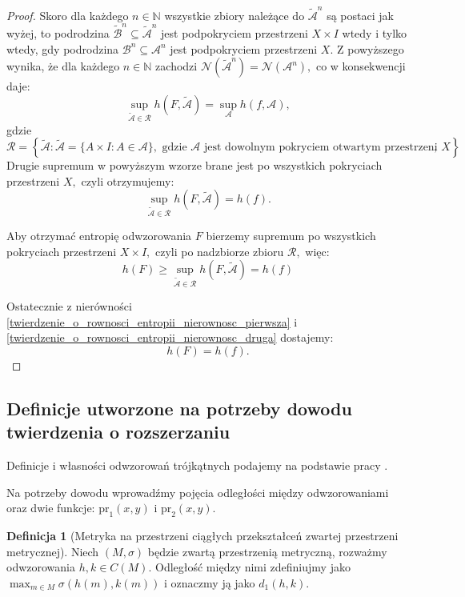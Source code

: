 \documentclass[licencjacka]{pwr_wmat_praca_dyplomowa}
\theoremstyle{plain}
\numberwithin{theorem}{chapter}
\theoremstyle{definition}
\numberwithin{theorem}{chapter}
\newtheorem{definition}[theorem]{Definicja}
\begin{document}
\begin{proof}
Skoro dla każdego $n \in \mathbb{N}$ wszystkie zbiory należące do ${\widetilde{\mathcal{A}}}^n$ są postaci jak wyżej, to podrodzina ${\widetilde{\mathcal{B}}}^n \subseteq {\widetilde{\mathcal{A}}}^n$ jest podpokryciem przestrzeni $X \times I$ wtedy i tylko wtedy, gdy podrodzina $\mathcal{B}^n \subseteq \mathcal{A}^n$ jest podpokryciem przestrzeni $X.$
Z powyższego wynika, że dla każdego $n \in \mathbb{N}$ zachodzi
$\mathcal{N}\left({\widetilde{\mathcal{A}}}^n\right) = \mathcal{N}(\mathcal{A}^n),$
co w konsekwencji daje:
$$\sup_{\widetilde{\mathcal{A}} \in \mathcal{R}} h(F, \widetilde{\mathcal{A}}) = \sup_{\mathcal{A}} h(f, \mathcal{A}),$$
gdzie 
$$\mathcal{R} = \left\{\widetilde{\mathcal{A}} : \widetilde{\mathcal{A}} = \{A \times I : A \in \mathcal{A}\}, \textrm{ gdzie } \mathcal{A} \textrm{ jest dowolnym pokryciem otwartym przestrzeni } X\right\},$$
Drugie supremum w powyższym wzorze brane jest po wszystkich pokryciach przestrzeni $X,$ czyli otrzymujemy:
$$\sup_{\widetilde{\mathcal{A}} \in \mathcal{R}} h(F, \widetilde{\mathcal{A}}) = h(f).$$

Aby otrzymać entropię odwzorowania $F$ bierzemy supremum po wszystkich pokryciach przestrzeni $X \times I,$ czyli po nadzbiorze zbioru $\mathcal{R},$ więc:
\begin{equation}
\label{twierdzenie_o_rownosci_entropii_nierownosc_druga}
h(F) \geq \sup_{\widetilde{\mathcal{A}} \in \mathcal{R}} h(F, \widetilde{\mathcal{A}})  = h(f)
\end{equation}


Ostatecznie z nierówności \ref{twierdzenie_o_rownosci_entropii_nierownosc_pierwsza} i \ref{twierdzenie_o_rownosci_entropii_nierownosc_druga} dostajemy:
$$h(F) = h(f).$$


\end{proof}



\subsection{Definicje utworzone na potrzeby dowodu twierdzenia o rozszerzaniu}
Definicje i własności odwzorowań trójkątnych podajemy na podstawie pracy \cite{balibrea2003topological}.

Na potrzeby dowodu wprowadźmy pojęcia odległości między odwzorowaniami oraz dwie funkcje: $\textrm{pr}_1(x, y)$ i $\textrm{pr}_2(x, y)$. 

\begin{definition}[Metryka na przestrzeni ciągłych przekształceń zwartej przestrzeni metrycznej]
\label{definicja_metryki_d_jeden}
Niech $(M, \sigma)$ będzie zwartą przestrzenią metryczną, rozważmy odwzorowania $h,k \in C(M)$. Odległość między nimi zdefiniujmy jako $\max_{m \in M} \sigma(h(m), k(m))$ i oznaczmy ją jako $d_1(h,k)$.
\end{definition}
\end{document}
